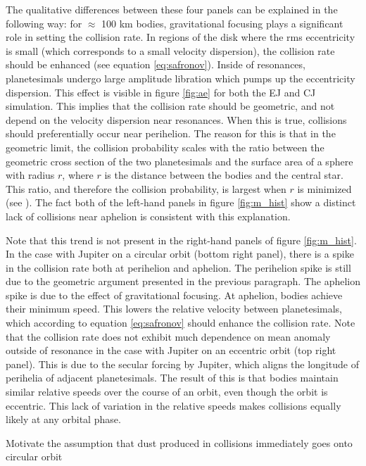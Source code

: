 \documentclass[twocolumn]{aastex63}
\begin{document}
The qualitative differences between these four panels can be explained in the following way: for $\approx$ 100 km bodies, 
gravitational focusing plays a significant role in setting the collision rate. In regions of the disk where the rms eccentricity is small 
(which corresponds to a small velocity dispersion), the collision rate should be enhanced (see equation \ref{eq:safronov}). Inside of 
resonances, planetesimals undergo large amplitude libration which pumps up the eccentricity dispersion. This effect is visible in 
figure \ref{fig:ae} for both the EJ and CJ simulation. This implies that the collision rate should be geometric, and not depend on the 
velocity dispersion near resonances. When this is true, collisions should preferentially occur near perihelion. The reason for this is 
that in the geometric limit, the collision probability scales with the ratio between the geometric cross section of the two planetesimals 
and the surface area of a sphere with radius $r$, where $r$ is the distance between the bodies and the central star. This ratio, and 
therefore the collision probability, is largest when $r$ is minimized (see \citet{2003AJ....125.2692L}). The fact both of the left-hand 
panels in figure \ref{fig:m_hist} show a distinct lack of collisions near aphelion is consistent with this explanation.

Note that this trend is not present in the right-hand panels of figure \ref{fig:m_hist}. In the case with Jupiter on a circular orbit (bottom right panel), there is a spike in the collision rate both at perihelion and aphelion. The perihelion spike is still due to the geometric argument presented in the previous paragraph. The aphelion spike is due to the effect of gravitational focusing. At aphelion, bodies achieve their minimum speed. This lowers the relative velocity between planetesimals, which according to equation \ref{eq:safronov} should enhance the collision rate. Note that the collision rate does not exhibit much dependence on mean anomaly outside of resonance in the case with Jupiter on an eccentric orbit (top right panel). This is due to the secular forcing by Jupiter, which aligns the longitude of perihelia of adjacent planetesimals. The result of this is that bodies maintain similar relative speeds over the course of an orbit, even though the orbit is eccentric. This lack of variation in the relative speeds makes collisions equally likely at any orbital phase.

Motivate the assumption that dust produced in collisions immediately goes onto circular orbit
\end{document}
